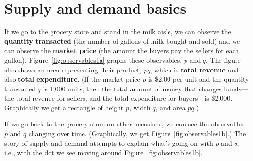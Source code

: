 \chapter{Supply and demand basics}%
\label{3basics}


\noindent If we go to the grocery store and stand in the milk aisle, we can observe the \textbf{quantity transacted} (the number of gallons of milk bought and sold) and we can observe the \textbf{market price} (the amount the buyers pay the sellers for each gallon). Figure~\ref{fig:observables1a} graphs these observables, $p$ and $q$. The figure also shows an area representing their product, $pq$, which is \textbf{total revenue} and also \textbf{total expenditure}. (If the market price $p$ is \$2.00 per unit and the quantity transacted $q$ is 1,000 units, then the total amount of money that changes hands---the total revenue for sellers, and the total expenditure for buyers---is \$2,000. Graphically we get a rectangle of height $p$, width $q$, and area $pq$.)




If we go back to the grocery store on other occasions, we can see the observables $p$ and $q$ changing over time. (Graphically, we get Figure~\ref{fig:observables1b}.) The story of supply and demand attempts to explain what's going on with $p$ and $q$, i.e., with the dot we see moving around Figure~\ref{fig:observables1b}.




